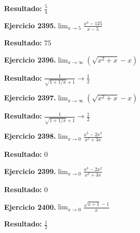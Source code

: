 \documentclass[10pt,a4paper]{article}
\begin{document}
\begin{solbox}
\textbf{Resultado:} \(\displaystyle \frac{5}{4}\)
\end{solbox}

\begin{ejbox}
\textbf{Ejercicio 2395.}\quad $\lim_{x\to 5} \frac{x^3-125}{x-5}$
\end{ejbox}

\begin{solbox}
\textbf{Resultado:} \(\displaystyle 75\)
\end{solbox}

\newpage
\begin{ejbox}
\textbf{Ejercicio 2396.}\quad $\lim_{x\to \infty} (\sqrt{x^2+x} - x)$
\end{ejbox}

\begin{solbox}
\textbf{Resultado:} \(\displaystyle \frac{1}{\sqrt{1+1/x}+1} \to \frac{1}{2}\)
\end{solbox}

\begin{ejbox}
\textbf{Ejercicio 2397.}\quad $\lim_{x\to \infty} (\sqrt{x^2+x} - x)$
\end{ejbox}

\begin{solbox}
\textbf{Resultado:} \(\displaystyle \frac{1}{\sqrt{1+1/x}+1} \to \frac{1}{2}\)
\end{solbox}

\begin{ejbox}
\textbf{Ejercicio 2398.}\quad $\lim_{x\to 0} \frac{x^3-2x^2}{x^2+3x}$
\end{ejbox}

\begin{solbox}
\textbf{Resultado:} \(\displaystyle 0\)
\end{solbox}

\newpage
\begin{ejbox}
\textbf{Ejercicio 2399.}\quad $\lim_{x\to 0} \frac{x^3-2x^2}{x^2+3x}$
\end{ejbox}

\begin{solbox}
\textbf{Resultado:} \(\displaystyle 0\)
\end{solbox}

\begin{ejbox}
\textbf{Ejercicio 2400.}\quad $\lim_{x\to 0} \frac{\sqrt{x+1}-1}{x}$
\end{ejbox}

\begin{solbox}
\textbf{Resultado:} \(\displaystyle \frac{1}{2}\)
\end{solbox}
\end{document}
